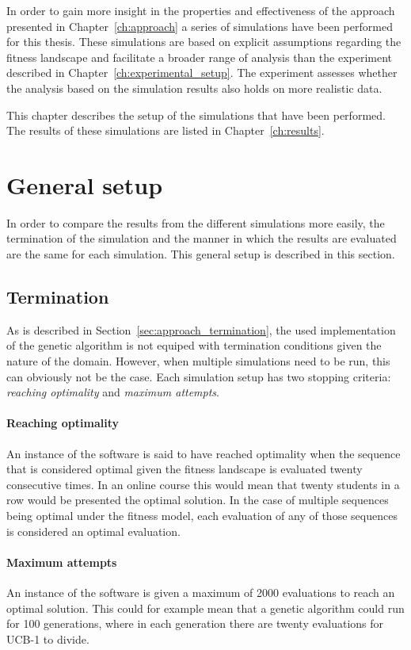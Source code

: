 In order to gain more insight in the properties and effectiveness of
the approach presented in Chapter~\ref{ch:approach} a series of
simulations have been performed for this thesis. These simulations are
based on explicit assumptions regarding the fitness landscape and
facilitate a broader range of analysis than the experiment described in
Chapter~\ref{ch:experimental_setup}. The experiment assesses whether the
analysis based on the simulation results also holds on more realistic data.

This chapter describes the setup of the simulations that have been performed.
The results of these simulations are listed in Chapter~\ref{ch:results}.

\section{General setup}
In order to compare the results from the different simulations more easily, the
termination of the simulation and the manner in which the results are evaluated
are the same for each simulation. This general setup is described in this
section.
\subsection{Termination}
\label{sec:simulations_termination}
As is described in Section~\ref{sec:approach_termination}, the used
implementation of the genetic algorithm is not equiped with termination
conditions given the nature of the domain. However, when multiple simulations
need to be run, this can obviously not be the case. Each simulation setup has
two stopping criteria: \emph{reaching optimality} and \emph{maximum attempts}.
\paragraph{Reaching optimality} An instance of the software is said to have
reached optimality when the sequence that is considered optimal given the
fitness landscape is evaluated twenty consecutive times. In an online course
this would mean that twenty students in a row would be presented the optimal
solution. In the case of multiple sequences being optimal under the fitness
model, each evaluation of any of those sequences is considered an optimal
evaluation.
\paragraph{Maximum attempts} An instance of the software is given a maximum of
2000 evaluations to reach an optimal solution. This could for example mean that
a genetic algorithm could run for 100 generations, where in each generation
there are twenty evaluations for UCB-1 to divide.

